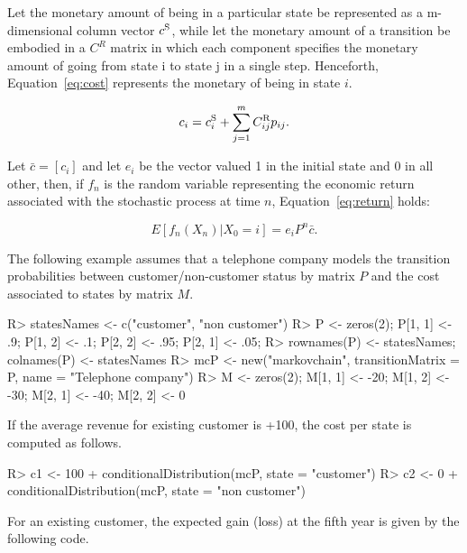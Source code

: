 \documentclass[nojss]{jss}
\begin{document}
Let the monetary amount of being in a particular state be represented as a m-dimensional column vector $c^{\rm{S}}$, while let the monetary amount of a transition be embodied in a $C^{R}$ matrix in which each component specifies the monetary amount of going from state i to state j in a single step. Henceforth, Equation~\ref{eq:cost} represents the monetary of being in state $i$.

\begin{equation}
{c_i} = c_i^{\rm{S}} + \sum\limits_{j = 1}^m {C_{ij}^{\rm{R}}} {p_{ij}}.
\label{eq:cost}
\end{equation}

Let $\bar c = \left[ c_i \right]$ and let $e_i$ be the vector valued 1 in the initial state and 0 in all other, then, if $f_n$ is the random variable representing the economic return associated with the stochastic process at time $n$, Equation~\ref{eq:return} holds:

\begin{equation}
E\left[ {{f_n}\left( {{X_n}} \right)|{X_0} = i} \right] = {e_i}{P^n}\bar c.
\label{eq:return}
\end{equation}

The following example assumes that a telephone company models the transition probabilities between customer/non-customer status by matrix $P$ and the cost associated to states by matrix $M$.

\begin{Schunk}
\begin{Sinput}
R> statesNames <- c("customer", "non customer")
R> P <- zeros(2); P[1, 1] <- .9; P[1, 2] <- .1; P[2, 2] <- .95; P[2, 1] <- .05;
R> rownames(P) <- statesNames; colnames(P) <- statesNames
R> mcP <- new("markovchain", transitionMatrix = P, name = "Telephone company")
R> M <- zeros(2); M[1, 1] <- -20; M[1, 2] <- -30; M[2, 1] <- -40; M[2, 2] <- 0
\end{Sinput}
\end{Schunk}

If the average revenue for existing customer is +100, the cost per state is computed as follows.

\begin{Schunk}
\begin{Sinput}
R> c1 <- 100 + conditionalDistribution(mcP, state = "customer") %
R> c2 <- 0 + conditionalDistribution(mcP, state = "non customer") %
\end{Sinput}
\end{Schunk}

For an existing customer, the expected gain (loss) at the fifth year is given by the following code.
\end{document}

